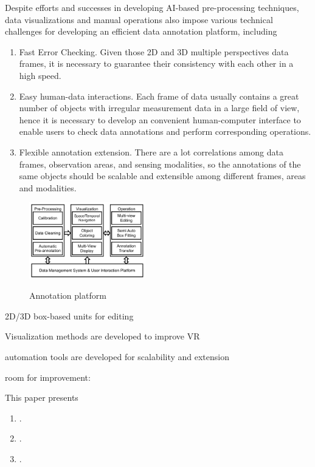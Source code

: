 \documentclass[letterpaper, 10 pt, conference]{ieeeconf}  %
\begin{document}
Despite efforts and successes in developing AI-based pre-processing techniques, data visualizations and manual operations also impose various technical challenges for developing an efficient data annotation platform, including
\begin{enumerate}
	\item Fast Error Checking.  Given those 2D and 3D multiple perspectives data frames, it is necessary to guarantee their consistency with each other in a high speed.
	\item Easy human-data interactions. Each frame of data usually contains a great number of objects with irregular measurement data in a large field of view, hence it is necessary to develop an convenient human-computer interface to enable users to check data annotations and perform corresponding operations.
	\item Flexible annotation extension. There are a lot correlations among data frames, observation areas, and sensing modalities, so the annotations of the same objects should be scalable and extensible among different frames, areas and modalities.
\end{enumerate}

\begin{figure}[tp]
	\centering
	\includegraphics[width=0.45\textwidth]{./platform}\\ %
	\caption{Annotation platform}
	\label{fig:main-arch}
	\vspace{-0.3cm}
\end{figure}


2D/3D box-based units for editing 

Visualization methods are developed to improve VR

automation tools are developed for scalability and extension 

room for improvement: 

This paper presents 
\begin{enumerate}
	
	\item.
	\item.
	\item.
	
\end{enumerate}
\end{document}
